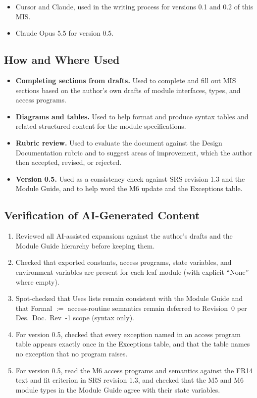 \documentclass[12pt, titlepage]{article}
\begin{document}
\begin{itemize}
  \item Cursor and Claude, used in the writing process for versions 0.1 and
    0.2 of this MIS.
  \item Claude Opus 5.5 for version 0.5.
\end{itemize}

\subsection{How and Where Used}

\begin{itemize}
  \item \textbf{Completing sections from drafts.} Used to complete and fill
    out MIS sections based on the author's own drafts of module interfaces,
    types, and access programs.
  \item \textbf{Diagrams and tables.} Used to help format and produce syntax
    tables and related structured content for the module specifications.
  \item \textbf{Rubric review.} Used to evaluate the document against the
    Design Documentation rubric and to suggest areas of improvement, which
    the author then accepted, revised, or rejected.
  \item \textbf{Version 0.5.} Used as a consistency check against SRS
    revision 1.3 and the Module Guide, and to help word the M6 update and the
    Exceptions table.
\end{itemize}

\subsection{Verification of AI-Generated Content}

\begin{enumerate}
  \item Reviewed all AI-assisted expansions against the author's drafts and
    the Module Guide hierarchy before keeping them.
  \item Checked that exported constants, access programs, state variables, and
    environment variables are present for each leaf module (with explicit
    ``None'' where empty).
  \item Spot-checked that Uses lists remain consistent with the Module Guide
    and that Formal $:=$ access-routine semantics remain deferred to
    Revision~0 per Des.\ Doc.\ Rev~-1 scope (syntax only).
  \item For version 0.5, checked that every exception named in an access
    program table appears exactly once in the Exceptions table, and that the
    table names no exception that no program raises.
  \item For version 0.5, read the M6 access programs and semantics against the
    FR14 text and fit criterion in SRS revision 1.3, and checked that the M5
    and M6 module types in the Module Guide agree with their state variables.
\end{enumerate}
\end{document}
